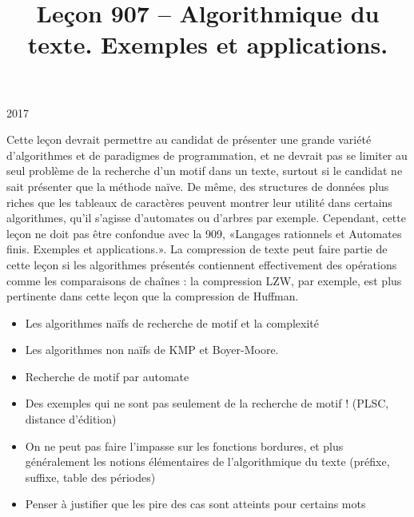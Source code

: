 \documentclass{agregfiche}
\title{Leçon 907 -- Algorithmique du texte. Exemples et applications.}
\begin{document}
\maketitle

\secrapports

\begin{rapport}{2017}

    Cette leçon devrait permettre au candidat de présenter une grande variété d’algorithmes et de paradigmes de programmation, et ne devrait pas se limiter au seul problème de la recherche d’un motif dans un texte, surtout si le candidat ne sait présenter que la méthode naïve. De même, des structures de données plus riches que les tableaux de caractères peuvent montrer leur utilité dans certains algorithmes, qu’il s’agisse d’automates ou d’arbres par exemple. Cependant, cette leçon ne doit pas être confondue avec la 909, «Langages rationnels et Automates finis. Exemples et applications.». La compression de texte peut faire partie de cette leçon si les algorithmes présentés contiennent effectivement des opérations comme les comparaisons de chaînes : la compression LZW, par exemple, est plus pertinente dans cette leçon que la compression de Huffman.

\end{rapport}

\secindispensables

\begin{itemize}
    \item Les algorithmes naïfs de recherche de motif et la complexité
    \item Les algorithmes non naïfs de KMP et Boyer-Moore.
    \item Recherche de motif par automate
    \item Des exemples qui ne sont pas seulement de la recherche 
        de motif ! (PLSC, distance d'édition)
    \item On ne peut pas faire l'impasse sur les fonctions bordures,
        et plus généralement les notions élémentaires de l'algorithmique
        du texte (préfixe, suffixe, table des périodes)
    \item Penser à justifier que les pire des cas sont atteints pour certains
        mots
\end{itemize}

\secpieges
\end{document}
